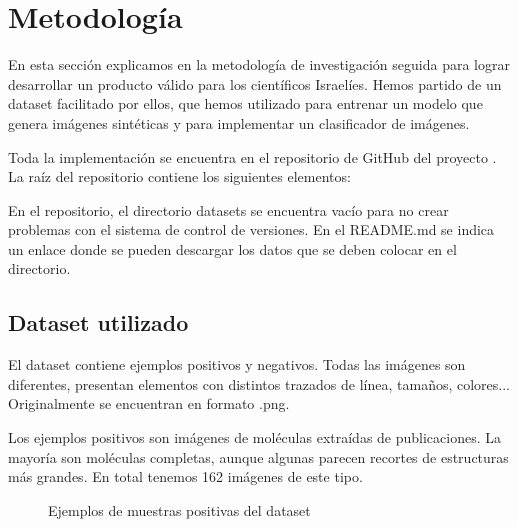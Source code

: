 \chapter{Metodología}

En esta sección explicamos en la metodología de investigación seguida para lograr desarrollar un producto válido para los científicos Israelíes. Hemos partido de un dataset facilitado por ellos, que hemos utilizado para entrenar un modelo que genera imágenes sintéticas y para implementar un clasificador de imágenes.

Toda la implementación se encuentra en el repositorio de GitHub del proyecto \cite{repository}. La raíz del repositorio contiene los siguientes elementos:


En el repositorio, el directorio datasets se encuentra vacío para no crear problemas con el sistema de control de versiones. En el README.md se indica un enlace donde se pueden descargar los datos que se deben colocar en el directorio.

\newpage
\section{Dataset utilizado}
El dataset contiene ejemplos positivos y negativos. Todas las imágenes son diferentes, presentan elementos con distintos trazados de línea, tamaños, colores... Originalmente se encuentran en formato .png.

Los ejemplos positivos son imágenes de moléculas extraídas de publicaciones. La mayoría son moléculas completas, aunque algunas parecen recortes de estructuras más grandes. En total tenemos 162 imágenes de este tipo.

\begin{figure}[H]
\centering
    \caption{Ejemplos de muestras positivas del dataset} 
\end{figure}

